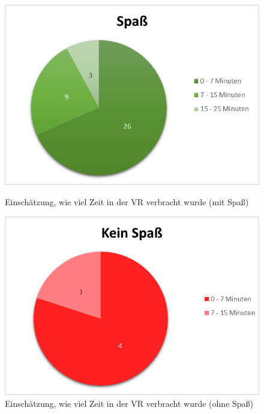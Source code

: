 \documentclass{Paper}
\begin{document}
\begin{figure}[H]
\begin{minipage}[t]{0.49\linewidth}
	\includegraphics[scale=0.7]{../Diagramme/spass/spass.png}
	\caption{Einschätzung, wie viel Zeit in der VR verbracht wurde (mit Spaß)}
	\label{spass}
\end{minipage}
\hfill
\begin{minipage}[t]{0.49\linewidth}
	\includegraphics[scale=0.7]{../Diagramme/spass/keinSpass.png}
	\caption{Einschätzung, wie viel Zeit in der VR verbracht wurde (ohne Spaß)}
	\label{keinspass}
\end{minipage}
\end{figure}
\end{document}
